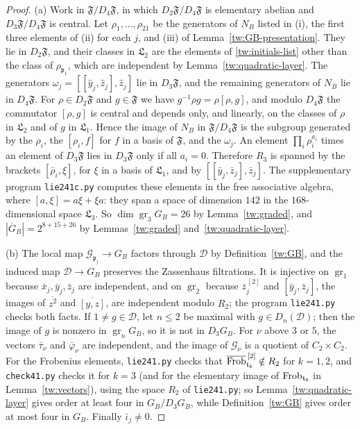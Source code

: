 \begin{proof}
(a) Work in $\mathfrak F/D_4\mathfrak F$, in which $D_2\mathfrak F/D_4\mathfrak F$
is elementary abelian and $D_3\mathfrak F/D_4\mathfrak F$ is central. Let
$\rho_1,\dots,\rho_{21}$ be the generators of $N_B$ listed in (i), the first
three elements of (ii) for each $j$, and (iii) of
Lemma~\ref{tw:GB-presentation}. They lie in $D_2\mathfrak F$, and their classes
in $\mathfrak L_2$ are the elements of \eqref{tw:initials-list} other than the
class of $\rho_{\mathfrak p_1}$, which are independent by
Lemma~\ref{tw:quadratic-layer}. The generators
$\omega_j=[[\hat y_j,\hat z_j],\hat z_j]$ lie in $D_3\mathfrak F$, and the
remaining generators of $N_B$ lie in $D_4\mathfrak F$. For $\rho\in D_2\mathfrak F$ and $g\in\mathfrak F$ we have
$g^{-1}\rho g=\rho[\rho,g]$, and modulo $D_4\mathfrak F$ the commutator
$[\rho,g]$ is central and depends only, and linearly, on the classes of
$\rho$ in $\mathfrak L_2$ and of $g$ in $\mathfrak L_1$. Hence the image of
$N_B$ in $\mathfrak F/D_4\mathfrak F$ is the subgroup generated by the $\rho_i$,
the $[\rho_i,f]$ for $f$ in a basis of $\mathfrak F$, and the $\omega_j$. An
element $\prod_i\rho_i^{a_i}$ times an element of $D_3\mathfrak F$ lies in
$D_3\mathfrak F$ only if all $a_i=0$. Therefore $R_3$ is spanned by the
brackets $[\bar\rho_i,\xi]$, for $\xi$ in a basis of $\mathfrak L_1$, and by
$[[\bar y_j,\bar z_j],\bar z_j]$. The supplementary program
\texttt{lie241c.py} computes these elements in the free associative algebra,
where $[a,\xi]=a\xi+\xi a$: they span a space of dimension $142$ in the
$168$-dimensional space $\mathfrak L_3$. So $\dim\operatorname{gr}_3G_B=26$
by Lemma~\ref{tw:graded}, and $|\overline G_B|=2^{8+15+26}$ by
Lemmas~\ref{tw:graded} and~\ref{tw:quadratic-layer}.

(b) The local map $\mathcal G_{\mathfrak p_j}\to G_B$ factors through $\mathcal D$ by
Definition~\ref{tw:GB}, and the induced map $\mathcal D\to G_B$ preserves the
Zassenhaus filtrations. It is injective on $\operatorname{gr}_1$ because
$\bar x_j,\bar y_j,\bar z_j$ are independent, and on $\operatorname{gr}_2$
because $\bar z_j^{\,[2]}$ and $[\bar y_j,\bar z_j]$, the images of
$\overline{z^2}$ and $\overline{[y,z]}$, are independent modulo $R_2$; the
program \texttt{lie241.py} checks both facts. If $1\neq g\in \mathcal D$, let $n\le2$
be maximal with $g\in D_n(\mathcal D)$; then the image of $g$ is nonzero in
$\operatorname{gr}_nG_B$, so it is not in $D_3G_B$. For $\nu$ above $3$ or
$5$, the vectors $\bar\tau_\nu$ and $\bar\varphi_\nu$ are independent, and the
image of $\mathcal G_\nu$ is a quotient of $C_2\times C_2$. For the Frobenius
elements, \texttt{lie241.py} checks that
$\overline{\operatorname{Frob}}_{\mathfrak t_k}^{\,[2]}\notin R_2$ for $k=1,2$, and
\texttt{check41.py} checks it for $k=3$ (and for the elementary image of
$\operatorname{Frob}_{\mathfrak t_4}$ in Lemma~\ref{tw:vectors}),
using the space $R_2$ of \texttt{lie241.py}; so
Lemma~\ref{tw:quadratic-layer} gives order at least four in $G_B/D_3G_B$,
while Definition~\ref{tw:GB} gives order at most four in $G_B$. Finally
$\bar\iota_j\neq0$.


\end{proof}
